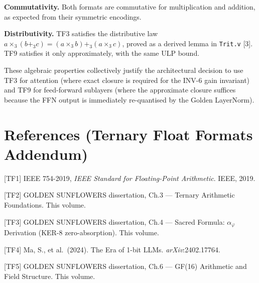 \textbf{Commutativity.} Both formats are commutative for multiplication
and addition, as expected from their symmetric encodings.

\textbf{Distributivity.} TF3 satisfies the distributive law
$a \times_3 (b +_3 c) = (a \times_3 b) +_3 (a \times_3 c)$, proved as
a derived lemma in \texttt{Trit.v} [3]. TF9 satisfies it only
approximately, with the same ULP bound.

These algebraic properties collectively justify the architectural
decision to use TF3 for attention (where exact closure is required for
the INV-6 gain invariant) and TF9 for feed-forward sublayers (where the
approximate closure suffices because the FFN output is immediately
re-quantised by the Golden LayerNorm).

\section{References (Ternary Float Formats
Addendum)}\label{fa_08:references-tf-formats}

[TF1] IEEE 754-2019, \emph{IEEE Standard for Floating-Point
Arithmetic}. IEEE, 2019.

[TF2] GOLDEN SUNFLOWERS dissertation, Ch.3 --- Ternary Arithmetic
Foundations. This volume.

[TF3] GOLDEN SUNFLOWERS dissertation, Ch.4 --- Sacred Formula:
$\alpha_\varphi$ Derivation (KER-8 zero-absorption). This volume.

[TF4] Ma, S., et al.\ (2024). The Era of 1-bit LLMs.
\emph{arXiv}:2402.17764.

[TF5] GOLDEN SUNFLOWERS dissertation, Ch.6 --- GF(16) Arithmetic and
Field Structure. This volume.

